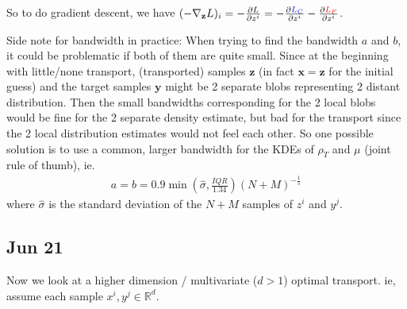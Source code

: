 \documentclass[11pt]{article}
\begin{document}
\begin{enumerate}
    So to do gradient descent, we have $(-\nabla_{\mathbf{z}} L)_i =  -\frac{\partial L}{\partial z^i} = -  \frac{\partial \textcolor{blue}{L_C}}{\partial z^i} -  \frac{\partial \textcolor{red}{L_F}}{\partial z^i}$.
    
    Side note for bandwidth in practice: When trying to find the bandwidth $a$ and $b$, it could be problematic if both of them are quite small. Since at the beginning with little/none transport, (transported) samples $\mathbf{z}$ (in fact $\mathbf{x}=\mathbf{z}$ for the initial guess) and the target samples $\mathbf{y}$ might be 2 separate blobs representing 2 distant distribution. Then the small bandwidths corresponding for the 2 local blobs would be fine for the 2 separate density estimate, but bad for the transport since the 2 local distribution estimates would not feel each other. So one possible solution is to use a common, larger bandwidth for the KDEs of $\rho_T$ and $\mu$ (joint rule of thumb), ie. 
    \begin{align*}
        a = b = 0.9 \min (\hat{\sigma}, \frac{IQR}{1.34}) (N+M)^{-\frac{1}{5}}
    \end{align*}
    where $\hat{\sigma}$ is the standard deviation of the $N+M$ samples of $z^i$ and $y^j$.
    
\end{enumerate}

\subsection{Jun 21}

Now we look at a higher dimension / multivariate ($d>1$) optimal transport. ie, assume each sample ${x} ^i,{y}^j \in \mathbb{R}^d$.
\end{document}
